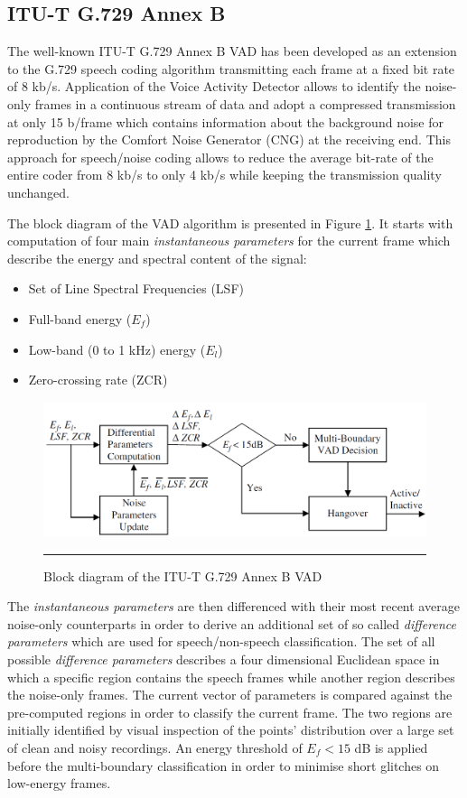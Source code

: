 \subsection{ITU-T G.729 Annex B}

The well-known ITU-T G.729 Annex B VAD has been developed as an extension to the G.729 speech coding algorithm \citep{G729Original} transmitting each frame at a fixed bit rate of 8 kb/s. Application of the Voice Activity Detector allows to identify the noise-only frames in a continuous stream of data and adopt a compressed transmission at only 15 b/frame which contains information about the background noise for reproduction by the Comfort Noise Generator (CNG) at the receiving end. This approach for speech/noise coding allows to reduce the average bit-rate of the entire coder from 8 kb/s to only 4 kb/s while keeping the transmission quality unchanged.

The block diagram of the VAD algorithm is presented in Figure \ref{fig:G729AnnexB}. It starts with computation of four main \emph{instantaneous parameters} for the current frame which describe the energy and spectral content of the signal:
\begin{itemize}
\item Set of Line Spectral Frequencies (LSF)
\item Full-band energy ($E_f$)
\item Low-band (0 to 1 kHz) energy ($E_l$)
\item Zero-crossing rate (ZCR)
\end{itemize}

\begin{figure}[htbp]
	\centering
		\includegraphics[width=0.9\columnwidth]{Figures/G729AnnexB.png}
		\rule{37em}{0.5pt}
	\caption[Block diagram of the ITU-T G.729 Annex B VAD]{Block diagram of the ITU-T G.729 Annex B VAD \cite{Kondoz}}
	\label{fig:G729AnnexB}
\end{figure}

The \emph{instantaneous parameters} are then differenced with their most recent average noise-only counterparts in order to derive an additional set of so called \emph{difference parameters} which are used for speech/non-speech classification. The set of all possible \emph{difference parameters} describes a four dimensional Euclidean space in which a specific region contains the speech frames while another region describes the noise-only frames. The current vector of parameters is compared against the pre-computed regions in order to classify the current frame. The two regions are initially identified by visual inspection of the points' distribution over a large set of clean and noisy recordings. An energy threshold of $E_f < 15$ dB is applied before the multi-boundary classification in order to minimise short glitches on low-energy frames.

